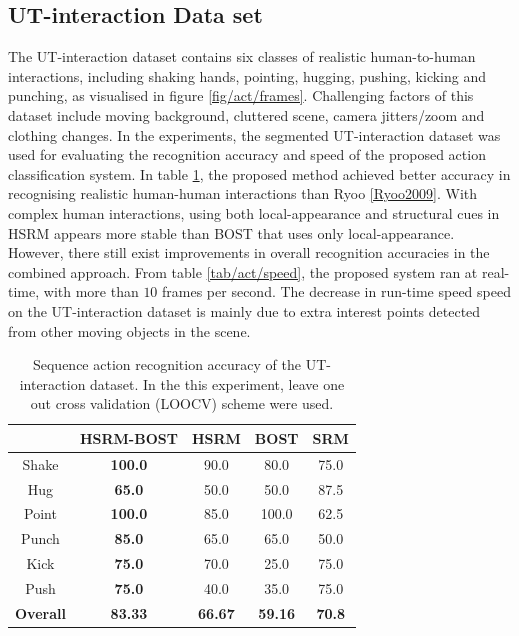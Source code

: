 \subsection{UT-interaction Data set}
The UT-interaction dataset contains six classes of realistic human-to-human interactions, including shaking hands, pointing, hugging, pushing, kicking and punching, as visualised in figure \ref{fig/act/frames}. 
Challenging factors of this dataset include moving background, cluttered scene, camera jitters/zoom and clothing changes. 
In the experiments, the segmented UT-interaction dataset was used for evaluating the recognition accuracy and speed of the proposed action classification system. 
In table \ref{tab/act/utcompare}, the proposed method achieved better accuracy in recognising realistic human-human interactions than Ryoo \etal \ref{Ryoo2009}. 
With complex human interactions, using both local-appearance and structural cues in HSRM appears more stable than BOST that uses only local-appearance. 
However, there still exist improvements in overall recognition accuracies in the combined approach. 
From table \ref{tab/act/speed}, the proposed system ran at real-time, with more than $10$ frames per second. 
The decrease in run-time speed speed on the UT-interaction dataset is mainly due to extra interest points detected from other moving objects in the scene.

\begin{table}
	\centering
	\begin{tabular}{|c|c|c|c|c|}
		\hline 
		\backslashbox{\textbf{Action}}{\textbf{Method}} & \textbf{\color{blue}HSRM-BOST} & \textbf{HSRM} & \textbf{BOST} & \textbf{SRM}\cite{Ryoo2009} \\
		\hline 
		Shake & \textbf{\color{blue}100.0} & 90.0 & 80.0 & 75.0 \\ 
		Hug & \textbf{\color{blue}65.0} & 50.0 & 50.0 & 87.5 \\ 
		Point & \textbf{\color{blue}100.0} & 85.0 & 100.0 & 62.5 \\ 
		Punch & \textbf{\color{blue}85.0} & 65.0 & 65.0 & 50.0 \\ 
		Kick & \textbf{\color{blue}75.0} & 70.0 & 25.0 & 75.0 \\ 
		Push & \textbf{\color{blue}75.0} & 40.0 & 35.0 & 75.0 \\ 
		\hline 	
		\textbf{ Overall } & \textbf{\color{blue}83.33} & \textbf{66.67} & \textbf{59.16} & \textbf{70.8} \\ 
		\hline 
	\end{tabular}
	\caption{Sequence action recognition accuracy of the UT-interaction dataset. In the this experiment, leave one out cross validation (LOOCV) scheme were used.}
	\label{tab/act/utcompare}
\end{table}

